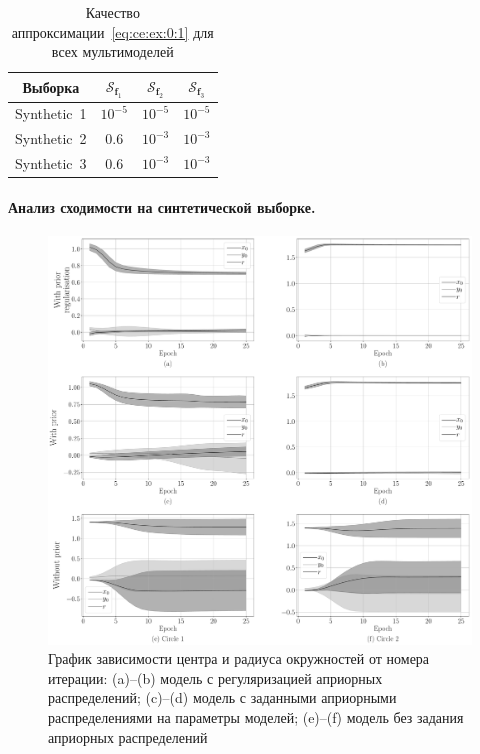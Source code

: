 \begin{table}[h!t]
\begin{center}
\caption{Качество аппроксимации~\eqref{eq:ce:ex:0:1} для всех мультимоделей}
\label{tb:ce:1}
\begin{tabular}{|c|c|c|c|}
\hline
	Выборка & $\mathcal{S}_{\textbf{f}_1}$ & $\mathcal{S}_{\textbf{f}_2} $& $\mathcal{S}_{\textbf{f}_3} $\\
	\hline
	\multicolumn{1}{|l|}{Synthetic~1}
	& $10^{-5}$& $10^{-5}$& $10^{-5}$\\
	\hline
	\multicolumn{1}{|l|}{Synthetic~2}
	& $0.6$& $10^{-3}$& $10^{-3}$\\
	\hline
	\multicolumn{1}{|l|}{Synthetic~3}
	& $0.6$& $10^{-3}$& $10^{-3}$\\
\hline
\end{tabular}
\end{center}
\end{table}

\paragraph{Анализ сходимости на синтетической выборке.}
\begin{figure}[h!t]\center
\includegraphics[width=1\textwidth]{results/priorexpert/experiment_synthetic_param_progress}
\caption{График зависимости центра и радиуса окружностей от номера итерации: (a)--(b) модель с регуляризацией априорных распределений; (c)--(d) модель с заданными априорными распределениями на параметры моделей; (e)--(f) модель без задания априорных распределений}
\label{experiment:st:2:1}
\end{figure}

